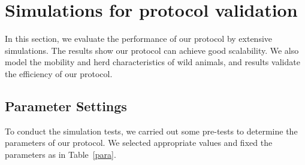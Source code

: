 \section{Simulations for protocol validation}
\label{Simulations}
In this section,
we evaluate the performance of our protocol by extensive simulations. 
The results show our protocol can achieve good scalability. 
We also model the mobility and herd characteristics of wild animals,
and results validate the efficiency of our protocol.

\subsection{Parameter Settings}

To conduct the simulation tests, we carried out some pre-tests to determine the 
parameters of our protocol.
We selected appropriate values and fixed the parameters as in Table~\ref{para}.

\begin{table}[htbp]
	\caption{Parameter Settings}
	\label{para}
	\centering
\end{table}

